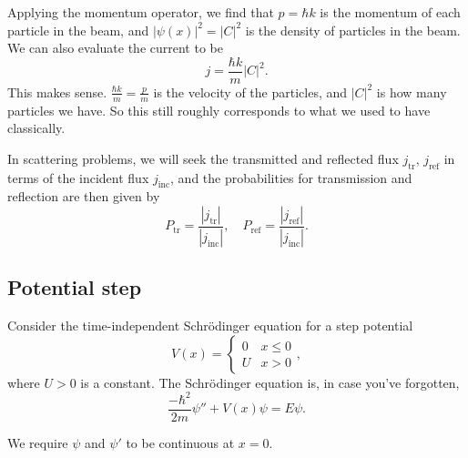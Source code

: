 \documentclass[a4paper]{article}
\begin{document}
Applying the momentum operator, we find that $p = \hbar k$ is the momentum of each particle in the beam, and $|\psi(x)|^2 = |C|^2$ is the density of particles in the beam. We can also evaluate the current to be
\[
  j = \frac{\hbar k}{m}|C|^2.
\]
This makes sense. $\frac{\hbar k}{m} = \frac{p}{m}$ is the velocity of the particles, and $|C|^2$ is how many particles we have. So this still roughly corresponds to what we used to have classically.

In scattering problems, we will seek the transmitted and reflected flux $j_{\mathrm{tr}}$, $j_{\mathrm{ref}}$ in terms of the incident flux $j_{\mathrm{inc}}$, and the probabilities for transmission and reflection are then given by
\[
  P_{\mathrm{tr}} = \frac{|j_{\mathrm{tr}}|}{|j_{\mathrm{inc}}|},\quad P_{\mathrm{ref}} = \frac{|j_{\mathrm{ref}}|}{|j_{\mathrm{inc}}|}.
\]
\subsection{Potential step}
Consider the time-independent Schr\"odinger equation for a step potential
\[
  V(x) =
  \begin{cases}
    0 & x \leq 0\\
    U & x > 0
  \end{cases},
\]
where $U > 0$ is a constant. The Schr\"odinger equation is, in case you've forgotten,
\[
  \frac{-\hbar^2}{2m}\psi'' + V(x) \psi = E\psi.
\]
\begin{center}
\end{center}
We require $\psi$ and $\psi'$ to be continuous at $x = 0$.
\end{document}
